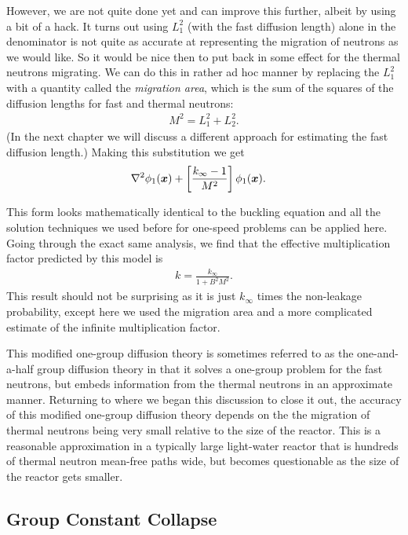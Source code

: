 However, we are not quite done yet and can improve this further, albeit by using a bit of a hack. It turns out using $L_1^2$ (with the fast diffusion length) alone in the denominator is not quite as accurate at representing the migration of neutrons as we would like. So it would be nice then to put back in some effect for the thermal neutrons migrating. We can do this in rather ad hoc manner by replacing the $L_1^2$ with a quantity called the \emph{migration area}, which is the sum of the squares of the diffusion lengths for fast and thermal neutrons:
\begin{align}
  M^2 = L_1^2 + L_2^2 .
\end{align}
(In the next chapter we will discuss a different approach for estimating the fast diffusion length.) Making this substitution we get
\begin{align}
  &\nabla^2\phi_1(\bm{x}) + \left[ \frac{ k_\infty - 1 }{ M^2 } \right] \phi_1(\bm{x}).
\end{align}

This form looks mathematically identical to the buckling equation and all the solution techniques we used before for one-speed problems can be applied here. Going through the exact same analysis, we find that the effective multiplication factor predicted by this model is
\begin{align}
  k = \frac{ k_\infty }{ 1 + B^2 M^2 } .
\end{align}
This result should not be surprising as it is just $k_\infty$ times the non-leakage probability, except here we used the migration area and a more complicated estimate of the infinite multiplication factor.

This modified one-group diffusion theory is sometimes referred to as the one-and-a-half group diffusion theory in that it solves a one-group problem for the fast neutrons, but embeds information from the thermal neutrons in an approximate manner. Returning to where we began this discussion to close it out, the accuracy of this modified one-group diffusion theory depends on the the migration of thermal neutrons being very small relative to the size of the reactor. This is a reasonable approximation in a typically large light-water reactor that is hundreds of thermal neutron mean-free paths wide, but becomes questionable as the size of the reactor gets smaller.

\subsection{Group Constant Collapse}

